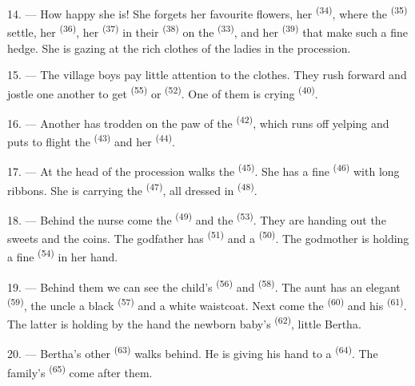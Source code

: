14. --- How happy she is! She forgets her favourite flowers, her
 \textsuperscript{(34)}, where the 
\textsuperscript{(35)} settle, her  \textsuperscript{(36)}, her
 \textsuperscript{(37)} in their 
\textsuperscript{(38)} on the  \textsuperscript{(33)}, and her 
\textsuperscript{(39)} that make such a fine hedge. She is gazing at the rich clothes of the
ladies in the procession.

15. --- The village boys pay little attention to the clothes. They rush forward and jostle one
another to get  \textsuperscript{(55)} or
 \textsuperscript{(52)}. One of them is crying \textsuperscript{(40)}.

16. --- Another has trodden on the paw of the  \textsuperscript{(42)}, which runs
off yelping and puts to flight the  \textsuperscript{(43)} and her 
\textsuperscript{(44)}.

\VUsaut{5.0mm}
\VUsaut{4.0mm}

17. --- At the head of the procession walks the  \textsuperscript{(45)}. She has
a fine  \textsuperscript{(46)} with long ribbons. She is carrying the
 \textsuperscript{(47)}, all dressed in 
\textsuperscript{(48)}.

18. --- Behind the nurse come the  \textsuperscript{(49)} and the
 \textsuperscript{(53)}. They are handing out the sweets and the
coins. The godfather has  \textsuperscript{(51)} and a 
\textsuperscript{(50)}. The godmother is holding a fine 
\textsuperscript{(54)} in her hand.

19. --- Behind them we can see the child's  \textsuperscript{(56)} and
 \textsuperscript{(58)}. The aunt has an elegant 
\textsuperscript{(59)}, the uncle a black  \textsuperscript{(57)} and a
white waistcoat. Next come the  \textsuperscript{(60)} and his
 \textsuperscript{(61)}. The latter is holding by the hand the
newborn baby's  \textsuperscript{(62)}, little Bertha.

20. --- Bertha's other  \textsuperscript{(63)} walks behind. He is giving his
hand to a  \textsuperscript{(64)}. The family's
 \textsuperscript{(65)} come after them.

